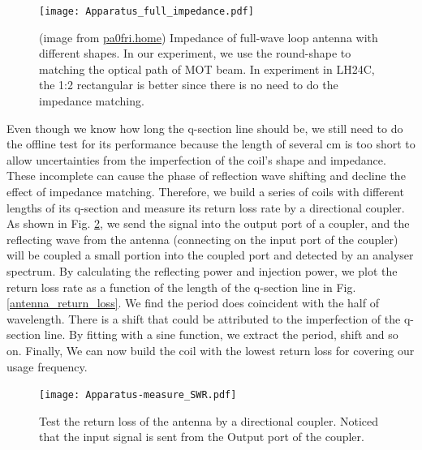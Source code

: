 \begin{figure}[htb]
\begin{center}
\texttt{[image: Apparatus\_full\_impedance.pdf]}
\end{center}
\caption[Impedance of full-wave loop antenna with different shapes]{(image from \href{https://pa0fri.home.xs4all.nl/Ant/Quad/quadeng.htm}{pa0fri.home}) Impedance of full-wave loop antenna with different shapes. In our experiment, we use the round-shape to matching the optical path of MOT beam. In experiment in LH24C, the 1:2 rectangular is better since there is no need to do the impedance matching.}  
\label{Apparatus_full_impedance}
\end{figure}

Even though we know how long the q-section line should be, we still need to do the offline test for its performance because the length of several cm is too short to allow uncertainties from the imperfection of the coil's shape and impedance. These incomplete can cause the phase of reflection wave shifting and decline the effect of impedance matching. Therefore, we build a series of coils with different lengths of its q-section and measure its return loss rate by a directional coupler. As shown in Fig. \ref{SWR_measure_method}, we send the signal into the output port of a coupler, and the reflecting wave from the antenna (connecting on the input port of the coupler) will be coupled a small portion into the coupled port and detected by an analyser spectrum. By calculating the reflecting power and injection power, we plot the return loss rate as a function of the length of the q-section line in Fig. \ref{antenna_return_loss}. We find the period does coincident with the half of wavelength. There is a shift that could be attributed to the imperfection of the q-section line. By fitting with a sine function, we extract the period, shift and so on. Finally, We can now build the coil with the lowest return loss for covering our usage frequency.

\begin{figure}[htb]
\begin{center}
\texttt{[image: Apparatus-measure\_SWR.pdf]}
\end{center}
\caption[Test method of the return loss of the antenna]{Test the return loss of the antenna by a directional coupler. Noticed that the input signal is sent from the Output port of the coupler.}
\label{SWR_measure_method}
\end{figure}

